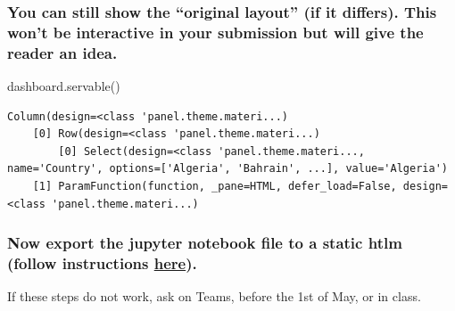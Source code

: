 \documentclass[
  letterpaper,
  DIV=11,
  numbers=noendperiod]{scrreprt}
\newenvironment{Shaded}{\begin{snugshade}}{\end{snugshade}}
\newcommand{\NormalTok}[1]{\textcolor[rgb]{0.00,0.23,0.31}{#1}}
\begin{document}
\subsubsection{You can still show the ``original layout'' (if it
differs). This won't be interactive in your submission but will give the
reader an
idea.}\label{you-can-still-show-the-original-layout-if-it-differs.-this-wont-be-interactive-in-your-submission-but-will-give-the-reader-an-idea.}

\begin{Shaded}
\begin{Highlighting}[]
\NormalTok{dashboard.servable()}
\end{Highlighting}
\end{Shaded}

\begin{verbatim}
Column(design=<class 'panel.theme.materi...)
    [0] Row(design=<class 'panel.theme.materi...)
        [0] Select(design=<class 'panel.theme.materi..., name='Country', options=['Algeria', 'Bahrain', ...], value='Algeria')
    [1] ParamFunction(function, _pane=HTML, defer_load=False, design=<class 'panel.theme.materi...)
\end{verbatim}

\subsubsection{\texorpdfstring{Now export the jupyter notebook file to a
static htlm (follow instructions
\href{https://gdsl-ul.github.io/wma/general/assessments.html\#submission-1}{here}).}{Now export the jupyter notebook file to a static htlm (follow instructions here).}}\label{now-export-the-jupyter-notebook-file-to-a-static-htlm-follow-instructions-here.}

If these steps do not work, ask on Teams, before the 1st of May, or in
class.
\end{document}
